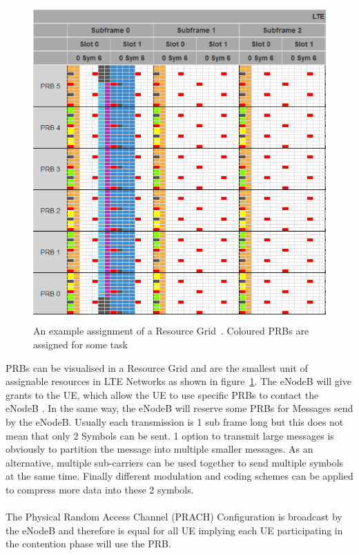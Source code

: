 \documentclass[conference]{IEEEtran}
\begin{document}
\begin{figure}
    \centering
    \includegraphics[width = \columnwidth]{../Figures/Resource_Grid1.PNG}
    \caption{An example assignment of a Resource Grid~\cite{ResourceGridCalculator}. Coloured PRBs are assigned for some task}
    \label{fig:grid}
\end{figure}
PRBs can be visualised in a Resource Grid and are the smallest unit of assignable resources in LTE Networks as shown in figure~\ref{fig:grid}.
The eNodeB will give grants to the UE, which allow the UE to use specific PRBs to contact the eNodeB .
In the same way, the eNodeB will reserve some PRBs for Messages send by the eNodeB.
Usually each transmission is 1 sub frame long but this does not mean that only 2 Symbols can be sent.
1 option to transmit large messages is obviously to partition the message into multiple smaller messages.
As an alternative, multiple sub-carriers can be used together to send multiple symbols at the same time.
Finally different modulation and coding schemes can be applied to compress more data into these 2 symbols.\\\\
The Physical Random Access Channel (PRACH) Configuration is broadcast by the eNodeB and therefore is equal for all UE implying each UE participating in the contention phase will use the PRB.
\end{document}
